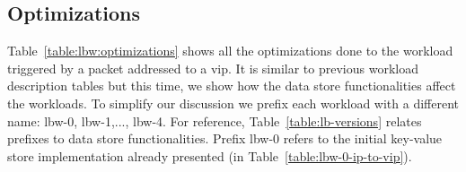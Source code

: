 \subsection{Optimizations}




Table~\ref{table:lbw:optimizations} shows all the optimizations done to the  workload triggered by a packet addressed to a \gls{vip}.
It is similar to previous workload description tables but this time, we show how the data store functionalities affect the workloads. 
To simplify our discussion we prefix each workload with a different name: lbw-0, lbw-1,..., lbw-4. 
For reference, Table~\ref{table:lb-versions} relates prefixes to data store functionalities. 
Prefix lbw-0 refers to the initial key-value store implementation already presented (in Table~\ref{table:lbw-0-ip-to-vip}). 



